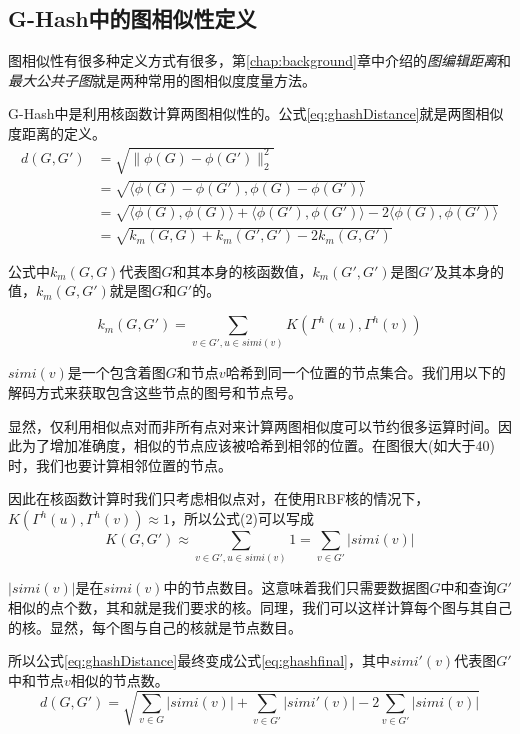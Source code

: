 \documentclass{XDBAthesis}
\begin{document}
\subsection{G-Hash中的图相似性定义}
图相似性有很多种定义方式有很多，第\ref{chap:background}章中介绍的\emph{图编辑距离}和\emph{最大公共子图}就是两种常用的图相似度度量方法。

G-Hash中是利用核函数计算两图相似性的。公式\eqref{eq:ghashDistance}就是两图相似度距离的定义。
\begin{equation}
\begin{split}
    d(G,G')&=\sqrt{\|\phi(G)-\phi(G')\|_{2}^{2}}\\
              &=\sqrt{\langle\phi(G)-\phi(G'),\phi(G)-\phi(G')\rangle}\\
              &=\sqrt{\langle\phi(G),\phi(G)\rangle+\langle\phi(G'),\phi(G')\rangle-2\langle\phi(G),\phi(G')\rangle}\\
              &=\sqrt{k_{m}(G,G)+k_{m}(G',G')-2k_{m}(G,G')}
\end{split}
\label{eq:ghashDistance}
\end{equation}

公式中$k_{m}(G,G)$代表图$G$和其本身的核函数值，$k_{m}(G',G')$是图$G'$及其本身的值，$k_{m}(G,G')$就是图$G$和$G'$的。

\begin{equation}
k_{m}(G,G')=\sum_{v\in G',u\in simi(v)}K(\Gamma^{h}(u),\Gamma^{h}(v))
\end{equation}

$simi(v)$是一个包含着图$G$和节点$v$哈希到同一个位置的节点集合。我们用以下的解码方式来获取包含这些节点的图号和节点号。

显然，仅利用相似点对而非所有点对来计算两图相似度可以节约很多运算时间。因此为了增加准确度，相似的节点应该被哈希到相邻的位置。在图很大(如大于40)时，我们也要计算相邻位置的节点。

因此在核函数计算时我们只考虑相似点对，在使用RBF核的情况下，$K(\Gamma^{h}(u),\Gamma^{h}(v))\approx1$，所以公式(2)可以写成
\begin{equation}
    K(G,G')\approx\sum_{v\in G',u\in simi(v)}1=\sum_{v\in G'}|simi(v)| 
\end{equation}

$|simi(v)|$是在$simi(v)$中的节点数目。这意味着我们只需要数据图$G$中和查询$G'$相似的点个数，其和就是我们要求的核。同理，我们可以这样计算每个图与其自己的核。显然，每个图与自己的核就是节点数目。

所以公式\eqref{eq:ghashDistance}最终变成公式\eqref{eq:ghashfinal}，其中$simi'(v)$代表图$G'$中和节点$v$相似的节点数。
\begin{equation}
    d(G,G')=\sqrt{\sum_{v\in G}|simi(v)|+\sum_{v\in G'}|simi'(v)| -2\sum_{v\in G'}|simi(v)| }
    \label{eq:ghashfinal}
\end{equation}
\end{document}

